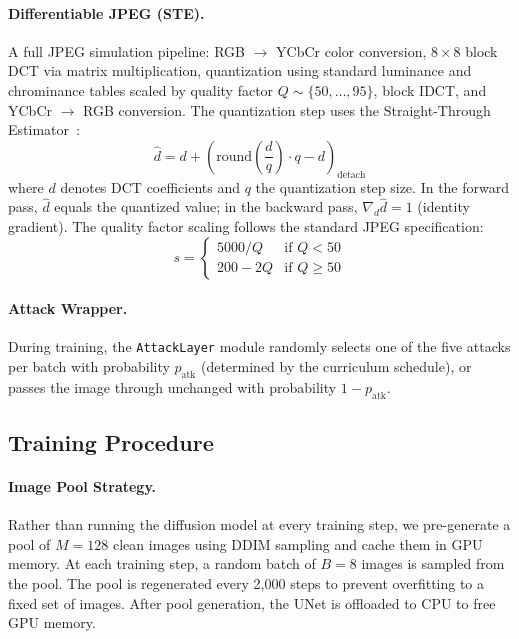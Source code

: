 \documentclass[10pt, twocolumn]{article}
\begin{document}
\paragraph{Differentiable JPEG (STE).}
A full JPEG simulation pipeline: RGB $\to$ YCbCr color conversion, $8\times8$ block DCT via matrix multiplication, quantization using standard luminance and chrominance tables scaled by quality factor $Q \sim \{50, \ldots, 95\}$, block IDCT, and YCbCr $\to$ RGB conversion.
The quantization step uses the Straight-Through Estimator~\cite{bengio2013estimating}:
\begin{equation}
    \hat{d} = d + \left(\text{round}\!\left(\frac{d}{q}\right) \cdot q - d\right)_\text{detach}
    \label{eq:ste}
\end{equation}
where $d$ denotes DCT coefficients and $q$ the quantization step size.
In the forward pass, $\hat{d}$ equals the quantized value; in the backward pass, $\nabla_d \hat{d} = 1$ (identity gradient).
The quality factor scaling follows the standard JPEG specification:
\begin{equation}
    s = \begin{cases} 5000 / Q & \text{if } Q < 50 \\ 200 - 2Q & \text{if } Q \geq 50 \end{cases}
    \label{eq:jpeg_scale}
\end{equation}

\paragraph{Attack Wrapper.}
During training, the \texttt{AttackLayer} module randomly selects one of the five attacks per batch with probability $p_\text{atk}$ (determined by the curriculum schedule), or passes the image through unchanged with probability $1 - p_\text{atk}$.

\subsection{Training Procedure}
\label{sec:training}

\paragraph{Image Pool Strategy.}
Rather than running the diffusion model at every training step, we pre-generate a pool of $M = 128$ clean images using DDIM sampling and cache them in GPU memory.
At each training step, a random batch of $B = 8$ images is sampled from the pool.
The pool is regenerated every 2{,}000 steps to prevent overfitting to a fixed set of images.
After pool generation, the UNet is offloaded to CPU to free GPU memory.
\end{document}
